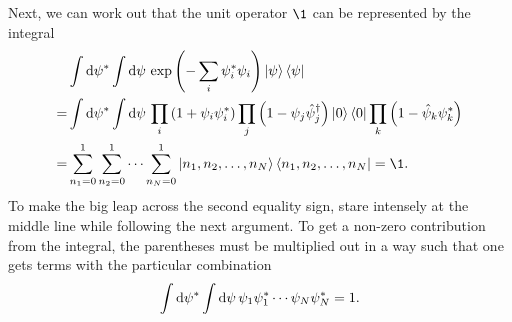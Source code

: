 Next, we can work out that the unit operator $\1$ can be represented by the integral
\begin{equation}
\begin{split}
	 \iffalse
	 & \int \dif \conj{\psi} \int \dif \psi \, e^{-\sum_i \conj\psi_i \psi_i} \ket{\psi} \bra{\psi} \\
	=& \int \dif \conj{\psi} \int \dif \psi \, \prod_i \left( 1 + \psi_i \conj{\psi}_i \right) \prod_j \left( 1 - \psi_j \creat_j \right) \ket{0} \bra{0} \prod_k \left( 1 - \destr_k \conj\psi_k \right) \\
	=& \int \dif \conj{\psi} \int \dif \psi \, \prod_i \left( 1 + \psi_i \conj{\psi}_i \right) \prod_j \left( 1 - \psi_j \creat_j \right) \ket{0} \bra{0} \left( 1 - \destr_j \conj\psi_j \right) \\
	=& \sum_{n_1=0}^1 \sum_{n_2=0}^1\cdots \sum_{n_N=0}^1 \ket{n_1, n_2, \ldots, n_N} \bra{n_1, n_2, \ldots, n_N} = \1 \\
	=& \int \dif \conj{\psi} \int \dif \psi \left[ \left( -\sum_i \conj{\psi}_i \psi_i \right) \ket{0} \bra{0} + \left( -\sum_j \psi_j \creat_j \right) \ket{0} \bra{0} \left( -\sum_k \destr_k \conj\psi_k \right) \right] \\
	=& \int \dif \conj{\psi} \int \dif \psi \left[ \sum_i \psi_i \conj\psi_i \ket{0} \bra{0} + \sum_{j,k} \psi_j \conj\psi_k \ket{1_j} \bra{1_k} \right] \\
	=& \ket{0} \bra{0} + \sum_j \ket{1_j} \bra{1_j} = \1 . \\
	\fi
	 & \int \dif \conj{\psi} \int \dif \psi \, \exp \left( -\sum_i \conj\psi_i \psi_i \right) \ket{\psi} \bra{\psi} \\
	=& \int \dif \conj{\psi} \int \dif \psi \, \prod_i \left( 1 + \psi_i \conj{\psi}_i \right) \prod_j \left( 1 - \psi_j \creat_j \right) \ket{0} \bra{0} \prod_k \left( 1 - \destr_k \conj\psi_k \right) \\
	=& \sum_{n_1=0}^1 \sum_{n_2=0}^1\cdots \sum_{n_N=0}^1 \ket{n_1, n_2, \ldots, n_N} \bra{n_1, n_2, \ldots, n_N} = \1 . \\
\end{split}
\label{eq:tft:completeness_grassmann_discrete}
\end{equation}
To make the big leap across the second equality sign, stare intensely at the middle  line while following the next argument.
To get a non-zero contribution from the integral, the parentheses must be multiplied out in a way such that one gets terms with the particular combination
\begin{equation}
	\int \mathop{}\!\mathrm{d} {\psi}^* \int \mathop{}\!\mathrm{d} \psi \, \psi_1 {\psi}^*_1 \cdots \psi_N {\psi}^*_N = 1 .
\label{eq:tft:integral_saturated}
\end{equation}
